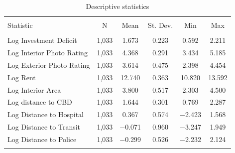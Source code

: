 
\begin{table}[H] \centering 
  \caption{Descriptive statistics} 
  \label{} 
\begin{tabular}{@{\extracolsep{-7pt}}lccccc} 
\\[-1.8ex]\hline 
\hline \\[-1.8ex] 
Statistic & \multicolumn{1}{c}{N} & \multicolumn{1}{c}{Mean} & \multicolumn{1}{c}{St. Dev.} & \multicolumn{1}{c}{Min} & \multicolumn{1}{c}{Max} \\ 
\hline \\[-1.8ex] 
Log Investment Deficit & 1,033 & 1.673 & 0.223 & 0.592 & 2.211 \\ 
Log Interior Photo Rating & 1,033 & 4.368 & 0.291 & 3.434 & 5.185 \\ 
Log Exterior Photo Rating & 1,033 & 3.614 & 0.475 & 2.398 & 4.454 \\ 
Log Rent & 1,033 & 12.740 & 0.363 & 10.820 & 13.592 \\ 
Log Interior Area & 1,033 & 3.800 & 0.517 & 2.303 & 4.500 \\ 
Log distance to CBD & 1,033 & 1.644 & 0.301 & 0.769 & 2.287 \\ 
Log Distance to Hospital & 1,033 & 0.367 & 0.574 & $-$2.423 & 1.568 \\ 
Log Distance to Transit & 1,033 & $-$0.071 & 0.960 & $-$3.247 & 1.949 \\ 
Log Distance to Police & 1,033 & $-$0.299 & 0.526 & $-$2.232 & 2.124 \\ 
\hline \\[-1.8ex] 
\end{tabular} 
\end{table} 
